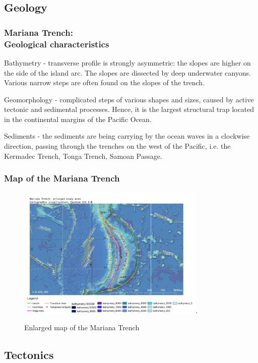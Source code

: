 \documentclass[pdflatex,compress,10pt,
	xcolor={dvipsnames,dvipsnames,svgnames,x11names,table},
	hyperref={colorlinks = true,breaklinks = true, urlcolor = NavyBlue, breaklinks = true}]{beamer}
\begin{document}
\subsection{Geology}

\begin{frame}\frametitle{Mariana Trench:\\Geological characteristics}
	\begin{exampleblock}{Bathymetry}
- transverse profile is strongly asymmetric: the slopes are higher on the side of the island arc. The slopes are dissected by deep underwater canyons. Various narrow steps are often found on the slopes of the trench.
	\end{exampleblock}
	\begin{exampleblock}{Geomorphology}
- complicated steps of various shapes and sizes, caused by active tectonic and sedimental processes. Hence, it is the largest structural trap located in the continental margins of the Pacific Ocean.
	\end{exampleblock}
	\begin{alertblock}{Sediments}
- the sediments are being carrying by the ocean waves in a clockwise direction, passing through the trenches on the west of the Pacific, i.e. the Kermadec Trench, Tonga Trench, Samoan Passage.
	\end{alertblock}
\end{frame}

\begin{frame}\frametitle{Map of the Mariana Trench}
	\begin{figure}[H]
			\centering
		\includegraphics[width=9cm]{Fig-2.jpg}.\caption{Enlarged map of the Mariana Trench}
	\end{figure}
\end{frame}
\subsection{Tectonics}
\end{document}

